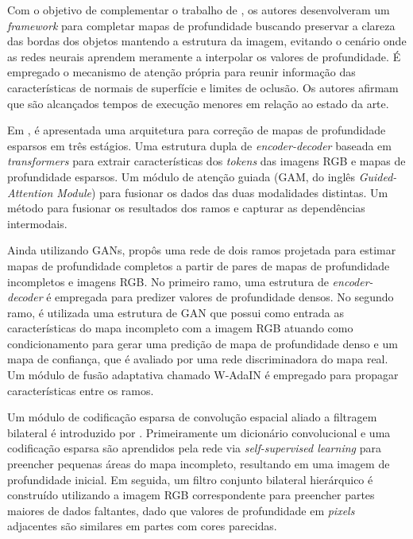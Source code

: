 Com o objetivo de complementar o trabalho de , os autores  desenvolveram um \textit{framework} para completar mapas de profundidade buscando preservar a clareza das bordas dos objetos mantendo a estrutura da imagem, evitando o cenário onde as redes neurais aprendem meramente a interpolar os valores de profundidade. É empregado o mecanismo de atenção própria para reunir informação das características de normais de superfície e limites de oclusão. Os autores afirmam que são alcançados tempos de execução menores em relação ao estado da arte.


Em , é apresentada uma arquitetura para correção de mapas de profundidade esparsos em três estágios. Uma estrutura dupla de \textit{encoder-decoder} baseada em \textit{transformers} para extrair características dos \textit{tokens} das imagens RGB e mapas de profundidade esparsos. Um módulo de atenção guiada (GAM, do inglês \textit{Guided-Attention Module}) para fusionar os dados das duas modalidades distintas. Um método para fusionar os resultados dos ramos e capturar as dependências intermodais. 



Ainda utilizando GANs,  propôs uma rede de dois ramos projetada para estimar mapas de profundidade completos a partir de pares de mapas de profundidade incompletos e imagens RGB. No primeiro ramo, uma estrutura de \textit{encoder-decoder} é empregada para predizer valores de profundidade densos. No segundo ramo, é utilizada uma estrutura de GAN que possui como entrada as características do mapa incompleto com a imagem RGB atuando como condicionamento para gerar uma predição de mapa de profundidade denso e um mapa de confiança, que é avaliado por uma rede discriminadora do mapa real. Um módulo de fusão adaptativa chamado W-AdaIN é empregado para propagar características entre os ramos. 



Um módulo de codificação esparsa de convolução espacial aliado a filtragem bilateral é introduzido por . Primeiramente um dicionário convolucional e uma codificação esparsa são aprendidos pela rede via \textit{self-supervised learning} para preencher pequenas áreas do mapa incompleto, resultando em uma imagem de profundidade inicial. Em seguida, um filtro conjunto bilateral hierárquico é construído utilizando a imagem RGB correspondente para preencher partes maiores de dados faltantes, dado que valores de profundidade em \textit{pixels} adjacentes são similares em partes com cores parecidas.




